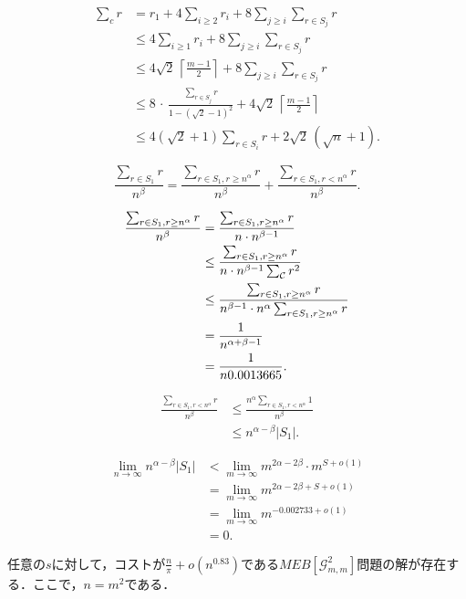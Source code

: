 \documentclass{classes/resume}
\begin{document}
\[
\begin{aligned}
  \sum_{c}r
  &= r_{1} + 4\sum_{i\ge2}r_{i}
       + 8\sum_{j\ge i}\sum_{r\in S_{j}}r \\ 
  &\le 4\sum_{i\ge1}r_{i}
       + 8\sum_{j\ge i}\sum_{r\in S_{j}}r \\ 
  &\le 4\sqrt{2}\,\left\lceil\frac{m-1}{2}\right\rceil
       + 8\sum_{j\ge i}\sum_{r\in S_{j}}r \\ 
  &\le 8 \,\cdot\, \frac{\sum_{r\in S_{j}}r}{1 - (\sqrt{2}-1)^{2}}
       + 4\sqrt{2}\,\left\lceil\frac{m-1}{2}\right\rceil \\ 
  &\le 4(\sqrt{2}+1)\sum_{r\in S_{i}}r
       + 2\sqrt{2}\,(\sqrt{n} + 1).
\end{aligned}
\]

\[
\frac{\sum_{r \in S_1} r}{n^{\beta}} = \frac{\sum_{r \in S_1, r \geq n^{\alpha}} r}{n^{\beta}} + \frac{\sum_{r \in S_1, r < n^{\alpha}} r}{n^{\beta}}.
\]

\[
\begin{aligned}
\frac{\sum_{r \in S_1, r \geq n^{\alpha}} r}{n^{\beta}}
&= \frac{\sum_{r \in S_1, r \geq n^{\alpha}} r}{n \cdot n^{\beta - 1}} \\
&\le \frac{\sum_{r \in S_1, r \geq n^{\alpha}} r}{n \cdot n^{\beta - 1}\sum_{\cal{C}}r^2} \\
&\le \frac{\sum_{r \in S_1, r \geq n^{\alpha}} r}{n^{\beta - 1} \cdot n^\alpha \sum_{r \in S_1, r \geq n^\alpha} r} \\
&= \frac{1}{n^{\alpha + \beta -1}} \\
&= \frac{1}{n0.0013665}.
\end{aligned}
\]

\[
\begin{aligned}
\frac{\sum_{r \in S_1, r < n^\alpha}r}{n^\beta} &\le \frac{n^\alpha \sum_{r \in S_1, r < n^\alpha} 1}{n^\beta} \\
&\leq n^{\alpha - \beta} |S_1|.
\end{aligned}
\]

\[
\begin{aligned}
\lim_{n \to \infty} n^{\alpha - \beta} |S_1| 
&< \lim_{m \to \infty} m^{2\alpha - 2\beta} \cdot m^{S + o(1)} \\
&= \lim_{m \to \infty} m^{2\alpha - 2\beta + S + o(1)} \\
&= \lim_{m \to \infty} m^{-0.002733 + o(1)} \\
&= 0.
\end{aligned}
\]

\begin{theorem}
    任意の$s$に対して，コストが$\frac{n}{\pi} + o(n^{0.83})$である$\mathit{MEB[\mathcal{G}_{m,m}^{2}]}$問題の解が存在する．ここで，$n = m^2$である．
\end{theorem}
\end{document}

